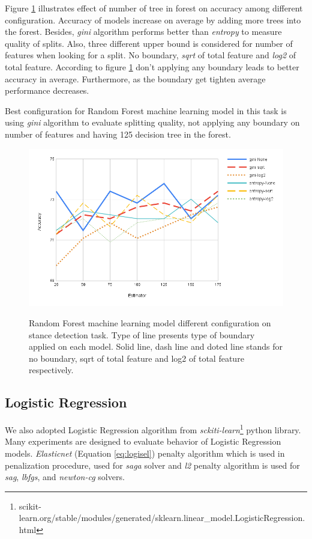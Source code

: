 Figure \ref{fig:randomforest} illustrates effect of number of tree in forest on accuracy among different configuration. Accuracy of models increase on average by adding more trees into the forest. Besides, \textit{gini} algorithm performs better than \textit{entropy} to measure quality of splits. Also, three different upper bound is considered for number of features when looking for a split. No boundary, \textit{sqrt} of total feature and \textit{log2} of total feature. According to figure \ref{fig:randomforest} don't applying any boundary leads to better accuracy in average. Furthermore, as the boundary get tighten average performance decreases. 

Best configuration for Random Forest machine learning model in this task is using \textit{gini} algorithm to evaluate splitting quality, not applying any boundary on number of features and having 125 decision tree in the forest. 
\begin{figure}%
	\centering
	{\includegraphics[width=12.5cm]{statistics/randomforest.png} }
	\caption{Random Forest machine learning model different configuration on stance detection task. Type of line presents type of boundary applied on each model. Solid line, dash line and doted line stands for no boundary, sqrt of total feature and log2 of total feature respectively.}%
	\label{fig:randomforest}%
\end{figure}
\subsection{Logistic Regression}
We also adopted Logistic Regression algorithm from \textit{sckiti-learn}\footnote{scikit-learn.org/stable/modules/generated/sklearn.linear\_model.LogisticRegression.html} python library. Many experiments are designed to evaluate behavior of Logistic Regression models. 	 \textit{Elasticnet} (Equation \ref{eq:logisel}) penalty algorithm which is used in penalization procedure, used for \textit{saga} solver and \textit{l2} penalty algorithm is used for \textit{sag}, \textit{lbfgs}, and \textit{newton-cg} solvers. 

